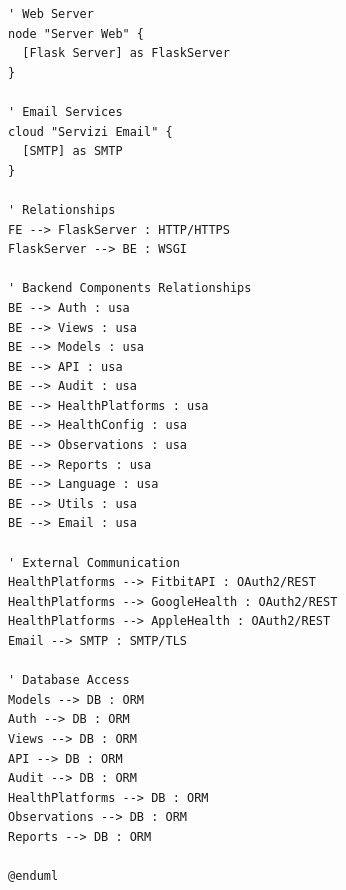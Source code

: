 \documentclass[12pt,a4paper,oneside]{report}
\begin{document}
\begin{lstlisting}[basicstyle=\small\ttfamily, breaklines=true]
' Web Server
node "Server Web" {
  [Flask Server] as FlaskServer
}

' Email Services
cloud "Servizi Email" {
  [SMTP] as SMTP
}

' Relationships
FE --> FlaskServer : HTTP/HTTPS
FlaskServer --> BE : WSGI

' Backend Components Relationships
BE --> Auth : usa
BE --> Views : usa
BE --> Models : usa
BE --> API : usa
BE --> Audit : usa
BE --> HealthPlatforms : usa
BE --> HealthConfig : usa
BE --> Observations : usa
BE --> Reports : usa
BE --> Language : usa
BE --> Utils : usa
BE --> Email : usa

' External Communication
HealthPlatforms --> FitbitAPI : OAuth2/REST
HealthPlatforms --> GoogleHealth : OAuth2/REST
HealthPlatforms --> AppleHealth : OAuth2/REST
Email --> SMTP : SMTP/TLS

' Database Access
Models --> DB : ORM
Auth --> DB : ORM
Views --> DB : ORM
API --> DB : ORM
Audit --> DB : ORM
HealthPlatforms --> DB : ORM
Observations --> DB : ORM
Reports --> DB : ORM

@enduml

\end{lstlisting}
\end{document}
